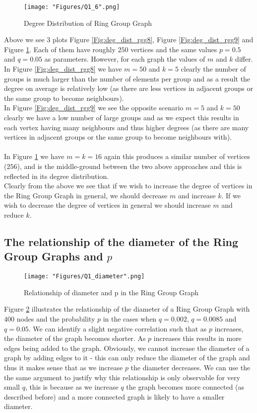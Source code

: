 \documentclass[12pt, a4paper]{article}
\begin{document}
 \begin{figure}[!htb]
     \centering
     \texttt{[image: "Figures/Q1\_6".png]}
     \caption{Degree Distribution of Ring Group Graph}
     \label{Fig:deg_dist_rgg10}
\end{figure}
Above we see 3 plots Figure \ref{Fig:deg_dist_rgg8}, Figure \ref{Fig:deg_dist_rgg9} and Figure \ref{Fig:deg_dist_rgg10}. Each of them have roughly $250$ vertices and the same values $p=0.5$ and $q=0.05$ as parameters. However, for each graph the values of $m$ and $k$ differ.\\
In Figure \ref{Fig:deg_dist_rgg8} we have $m=50$ and $k=5$ clearly the number of groups is much larger than the  number of elements per group and as a result the degree on average is relatively low (as there are less vertices in adjacent groups or the same group to become neighbours).\\
In Figure \ref{Fig:deg_dist_rgg9} we see the opposite scenario $m=5$ and $k=50$ clearly we have a low number of large groups and as we expect this results in each vertex having many neighbours and thus higher degrees (as there are many vertices in adjacent groups or the same group to become neighbours with).\\
\\
In Figure \ref{Fig:deg_dist_rgg10} we have $m=k=16$ again this produces a similar number of vertices ($256$), and is the middle-ground between the two above approaches and this is reflected in its degree distribution. \\
Clearly from the above we see that if we wish to increase the degree of vertices in the Ring Group Graph in general, we should decrease $m$ and increase $k$. If we wish to decrease the degree of vertices in general we should increase $m$ and reduce $k$.
\subsection*{The relationship of the diameter of the Ring Group Graphs and $p$}
 \begin{figure}[!htb]
     \centering
     \texttt{[image: "Figures/Q1\_diameter".png]}
     \caption{Relationship of diameter and p in the Ring Group Graph}
     \label{Fig:diameter}
\end{figure}
Figure \ref{Fig:diameter} illustrates the relationship of the diameter of a Ring Group Graph with $400$ nodes and the probability $p$ in the cases when $q= 0.002$, $q=0.0085$ and $q=0.05$. We can identify a slight negative correlation such that as $p$ increases, the diameter of the graph becomes shorter. As $p$ increases this results in more edges being added to the graph. Obviously, we cannot increase the diameter of a graph by adding edges to it - this can only reduce the diameter of the graph and thus it makes sense that as we increase $p$ the diameter decreases. We can use the the same argument to justify why this relationship is only observable for very small $q$, this is because as we increase $q$ the graph becomes more connected (as described before) and a more connected graph is likely to have a smaller diameter.
\newpage
\end{document}
